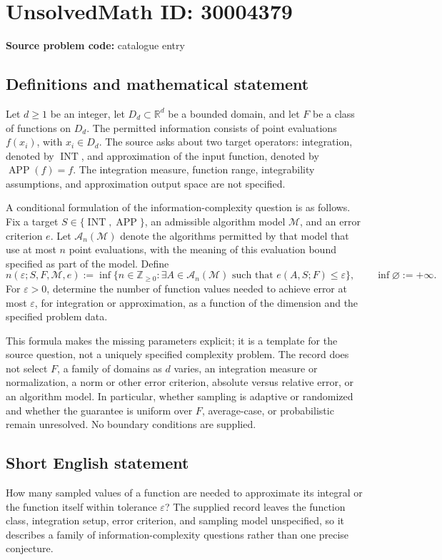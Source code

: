 \documentclass[11pt]{article}
\newcommand{\Z}{\mathbb{Z}}
\newcommand{\R}{\mathbb{R}}
\begin{document}
\section*{UnsolvedMath ID: 30004379}
\textbf{Source problem code:} catalogue entry
\subsection{Definitions and mathematical statement}
Let \(d\geq 1\) be an integer, let \(D_d\subset\R^d\) be a bounded domain, and let \(F\) be a class of functions on \(D_d\). The permitted information consists of point evaluations \(f(x_i)\), with \(x_i\in D_d\). The source asks about two target operators: integration, denoted by \(\operatorname{INT}\), and approximation of the input function, denoted by \(\operatorname{APP}(f)=f\). The integration measure, function range, integrability assumptions, and approximation output space are not specified.

A conditional formulation of the information-complexity question is as follows. Fix a target \(S\in\{\operatorname{INT},\operatorname{APP}\}\), an admissible algorithm model \(\mathcal M\), and an error criterion \(e\). Let \(\mathcal A_n(\mathcal M)\) denote the algorithms permitted by that model that use at most \(n\) point evaluations, with the meaning of this evaluation bound specified as part of the model. Define
\[
 n(\varepsilon;S,F,\mathcal M,e)
 :=\inf\bigl\{n\in\Z_{\geq0}:\exists A\in\mathcal A_n(\mathcal M)\text{ such that }e(A,S;F)\leq\varepsilon\bigr\},
 \qquad \inf\varnothing:=+\infty.
\]
For \(\varepsilon>0\), determine the number of function values needed to achieve error at most \(\varepsilon\), for integration or approximation, as a function of the dimension and the specified problem data.

This formula makes the missing parameters explicit; it is a template for the source question, not a uniquely specified complexity problem. The record does not select \(F\), a family of domains as \(d\) varies, an integration measure or normalization, a norm or other error criterion, absolute versus relative error, or an algorithm model. In particular, whether sampling is adaptive or randomized and whether the guarantee is uniform over \(F\), average-case, or probabilistic remain unresolved. No boundary conditions are supplied.
\subsection{Short English statement}
How many sampled values of a function are needed to approximate its integral or the function itself within tolerance \(\varepsilon\)? The supplied record leaves the function class, integration setup, error criterion, and sampling model unspecified, so it describes a family of information-complexity questions rather than one precise conjecture.
\end{document}
